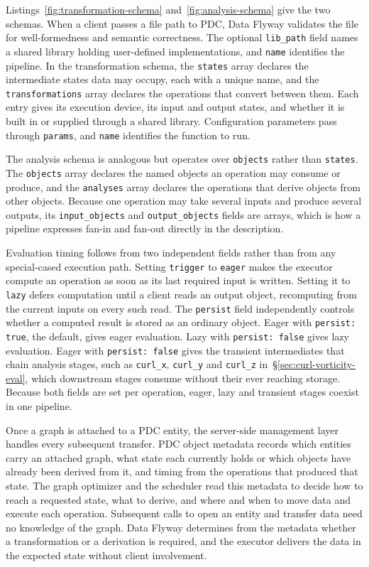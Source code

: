 Listings~\ref{fig:transformation-schema} and~\ref{fig:analysis-schema} give
the two schemas. When a client passes a file path to PDC, Data Flyway
validates the file for well-formedness and semantic correctness. The
optional \texttt{lib\_path} field names a shared library holding
user-defined implementations, and \texttt{name} identifies the pipeline. In
the transformation schema, the \texttt{states} array declares the
intermediate states data may occupy, each with a unique name, and the
\texttt{transformations} array declares the operations that convert between
them. Each entry gives its execution device, its input and output states,
and whether it is built in or supplied through a shared library.
Configuration parameters pass through \texttt{params}, and \texttt{name}
identifies the function to run.

The analysis schema is analogous but operates over \texttt{objects} rather
than \texttt{states}. The \texttt{objects} array declares the named objects
an operation may consume or produce, and the \texttt{analyses} array
declares the operations that derive objects from other objects. Because one
operation may take several inputs and produce several outputs, its
\texttt{input\_objects} and \texttt{output\_objects} fields are arrays,
which is how a pipeline expresses fan-in and fan-out directly in the
description.

Evaluation timing follows from two independent fields rather than from any
special-cased execution path. Setting \texttt{trigger} to \texttt{eager}
makes the executor compute an operation as soon as its last required input
is written. Setting it to \texttt{lazy} defers computation until a client
reads an output object, recomputing from the current inputs on every such
read. The \texttt{persist} field independently controls whether a computed
result is stored as an ordinary object. Eager with \texttt{persist: true},
the default, gives eager evaluation. Lazy with \texttt{persist: false}
gives lazy evaluation. Eager with \texttt{persist: false} gives the
transient intermediates that chain analysis stages, such as
\texttt{curl\_x}, \texttt{curl\_y} and \texttt{curl\_z}
in~\S\ref{sec:curl-vorticity-eval}, which downstream stages consume without
their ever reaching storage. Because both fields are set per operation,
eager, lazy and transient stages coexist in one pipeline.

Once a graph is attached to a PDC entity, the server-side management layer
handles every subsequent transfer. PDC object metadata records which
entities carry an attached graph, what state each currently holds or which
objects have already been derived from it, and timing from the operations
that produced that state. The graph optimizer and the scheduler read this
metadata to decide how to reach a requested state, what to derive, and
where and when to move data and execute each operation. Subsequent calls to
open an entity and transfer data need no knowledge of the graph. Data
Flyway determines from the metadata whether a transformation or a
derivation is required, and the executor delivers the data in the expected
state without client involvement.

